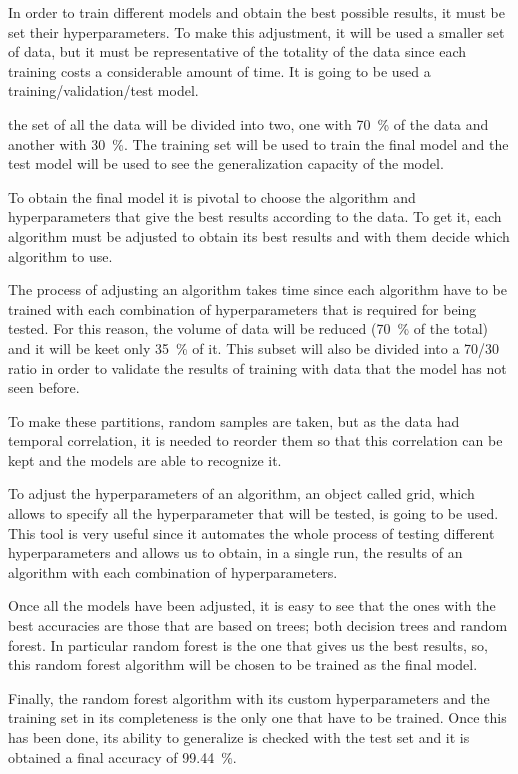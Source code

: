  In order to train different models and obtain the best possible results, it must be set their hyperparameters. To make this adjustment, it will be used a smaller set of data, but it must be representative of the totality of the data since each training costs a considerable amount of time. It is going to be used a training/validation/test model.


the set of all the data will be divided into two, one with \SI{70}{\percent} of the data and another with \SI{30}{\percent}. The training set will be used to train the final model and the test model will be used to see the generalization capacity of the model.


To obtain the final model it is pivotal to choose the algorithm and hyperparameters that give the best results according to the data. To get it, each algorithm must be adjusted to obtain its best results and with them decide which algorithm to use.


The process of adjusting an algorithm takes time since each algorithm have to be trained with each combination of hyperparameters that is required for being tested. For this reason, the volume of data will be reduced (\SI{70}{\percent} of the total) and it will be keet only \SI{35}{\percent} of it. This subset will also be divided into a 70/30 ratio in order to validate the results of training with data that the model has not seen before.


To make these partitions, random samples are taken, but as the data had temporal correlation, it is needed to reorder them so that this correlation can be kept and the models are able to recognize it. 


To adjust the hyperparameters of an algorithm, an object called grid, which allows to specify all the hyperparameter that will be tested, is going to be used. This tool is very useful since it automates the whole process of testing different hyperparameters and allows us to obtain, in a single run, the results of an algorithm with each combination of hyperparameters.


Once all the models have been adjusted, it is easy to see that the ones with the best accuracies are those that are based on trees; both decision trees and random forest. In particular random forest is the one that gives us the best results, so, this random forest algorithm will be chosen to be trained as the final model. 


Finally, the random forest algorithm with its custom hyperparameters and the training set in its completeness is the only one that have to be trained. Once this has been done, its ability to generalize is checked with the test set and it is obtained a final accuracy of \SI{99.44}{\percent}. 


